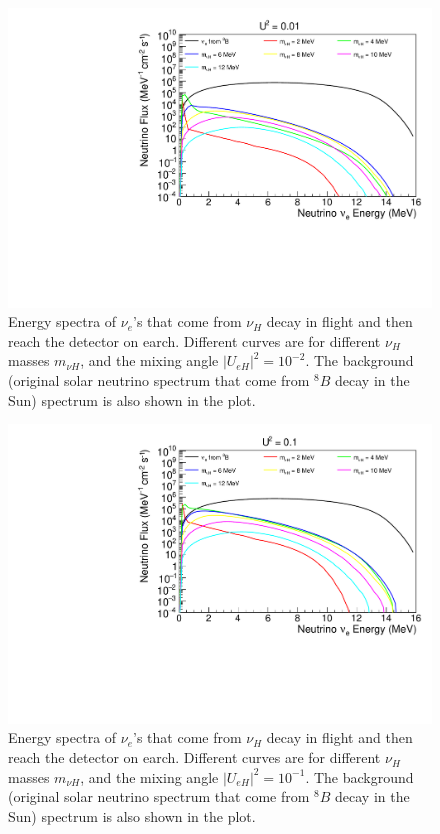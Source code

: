 \documentclass[%
 reprint,
 amsmath,amssymb,
 aps,
 prd,
twocolumn,
]{revtex4-1}
\begin{document}
\begin{figure}[!ht]
\includegraphics[width=0.99\columnwidth]{../plots/DecayInFlightNuLEnergy_U0.01_AllMass_linXlogY.pdf}
\caption{Energy spectra of $\nu_e$'s that come from $\nu_H$ decay in flight and then reach the detector on earch. Different curves are for different $\nu_H$ masses $m_{\nu H}$, and the mixing angle $|U_{eH}|^2 = 10^{-2}$. 
The background (original solar neutrino spectrum that come from $^8 B$ decay in the Sun) spectrum is also shown in the plot.}
\label{fig:DecayInFlightSpectrum_U1em2_AllMass}
\end{figure}

\begin{figure}[!ht]
\includegraphics[width=0.99\columnwidth]{../plots/DecayInFlightNuLEnergy_U0.1_AllMass_linXlogY.pdf}
\caption{Energy spectra of $\nu_e$'s that come from $\nu_H$ decay in flight and then reach the detector on earch. Different curves are for different $\nu_H$ masses $m_{\nu H}$, and the mixing angle $|U_{eH}|^2 = 10^{-1}$. 
The background (original solar neutrino spectrum that come from $^8 B$ decay in the Sun) spectrum is also shown in the plot.}
\label{fig:DecayInFlightSpectrum_U1em1_AllMass}
\end{figure}
\end{document}
